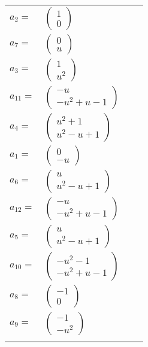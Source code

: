 \documentclass[1p]{elsarticle_modified}
\theoremstyle{definition}
\begin{document}
\begin{tabular}{m{7pt} m{180pt} m{7pt} m{180pt} }
\flushright $a_{2}=$&$\begin{pmatrix}1\\0\end{pmatrix}$ \\
\flushright $a_{7}=$&$\begin{pmatrix}0\\u\end{pmatrix}$ \\
\flushright $a_{3}=$&$\begin{pmatrix}1\\u^2\end{pmatrix}$ \\
\flushright $a_{11}=$&$\begin{pmatrix}- u\\- u^2+u-1\end{pmatrix}$ \\
\flushright $a_{4}=$&$\begin{pmatrix}u^2+1\\u^2- u+1\end{pmatrix}$ \\
\flushright $a_{1}=$&$\begin{pmatrix}0\\- u\end{pmatrix}$ \\
\flushright $a_{6}=$&$\begin{pmatrix}u\\u^2- u+1\end{pmatrix}$ \\
\flushright $a_{12}=$&$\begin{pmatrix}- u\\- u^2+u-1\end{pmatrix}$ \\
\flushright $a_{5}=$&$\begin{pmatrix}u\\u^2- u+1\end{pmatrix}$ \\
\flushright $a_{10}=$&$\begin{pmatrix}- u^2-1\\- u^2+u-1\end{pmatrix}$ \\
\flushright $a_{8}=$&$\begin{pmatrix}-1\\0\end{pmatrix}$ \\
\flushright $a_{9}=$&$\begin{pmatrix}-1\\- u^2\end{pmatrix}$\\&\end{tabular}
\end{document}

